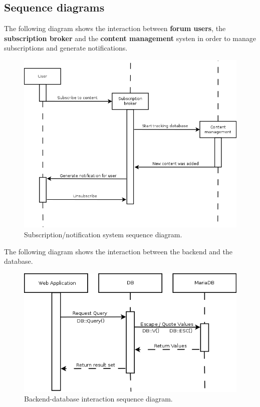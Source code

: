 \documentclass[12pt]{report}
\renewcommand\emph{\textbf}
\begin{document}
                    \newpage
                    \newpage

                \subsection{Sequence diagrams}                    

                    The following diagram shows the interaction between \emph{forum users}, the \emph{subscription broker} and the \emph{content management} systen in order to manage subscriptions and generate notifications.

                    \begin{figure}[H]
                    \caption{Subscription/notification system sequence diagram.}
                    \centering
                    \includegraphics[width=1\textwidth]{uc/s1}
                    \end{figure}

                    \newpage

                    The following diagram shows the interaction between the backend and the database.

                    \begin{figure}[H]
                    \caption{Backend-database interaction sequence diagram.}
                    \centering
                    \includegraphics[width=1\textwidth]{di/0}
                    \end{figure}
\end{document}
